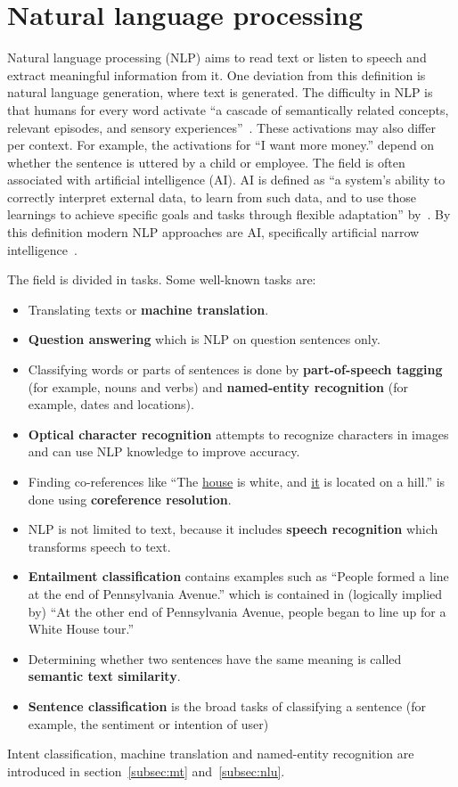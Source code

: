 \section{Natural language processing}
\label{sec:nlp}

Natural language processing (NLP) aims to read text or listen to speech and extract meaningful information from it.
One deviation from this definition is natural language generation, where text is generated.
The difficulty in NLP is that humans for every word activate ``a cascade of semantically related concepts, relevant episodes, and sensory experiences''~\citep{cambria2014jumping}.
These activations may also differ per context.
For example, the activations for ``I want more money.'' depend on whether the sentence is uttered by a child or employee.
The field is often associated with artificial intelligence (AI).
AI is defined as ``a system's ability to correctly interpret external data, to learn from such data, and to use those learnings to achieve specific goals and tasks through flexible adaptation'' by~\citep{kaplan2019siri}.
By this definition modern NLP approaches are AI, specifically artificial narrow intelligence~\citep{kaplan2019siri}.

The field is divided in tasks.
Some well-known tasks are:
\begin{itemize}
    \item Translating texts or \textbf{machine translation}.
    \item \textbf{Question answering} which is NLP on question sentences only.
    \item Classifying words or parts of sentences is done by \textbf{part-of-speech tagging} (for example, nouns and verbs) and \textbf{named-entity recognition} (for example, dates and locations).
    \item \textbf{Optical character recognition} attempts to recognize characters in images and can use NLP knowledge to improve accuracy.
    \item Finding co-references like ``The \underline{house} is white, and \underline{it} is located on a hill.'' is done using \textbf{coreference resolution}.
    \item NLP is not limited to text, because it includes \textbf{speech recognition} which transforms speech to text.
    \item \textbf{Entailment classification} contains examples such as ``People formed a line at the end of Pennsylvania Avenue.'' which is contained in (logically implied by) ``At the other end of Pennsylvania Avenue, people began to line up for a White House tour.''~\cite{williams2018}
    \item Determining whether two sentences have the same meaning is called \textbf{semantic text similarity}.
    \item \textbf{Sentence classification} is the broad tasks of classifying a sentence (for example, the sentiment or intention of user)
\end{itemize}
Intent classification, machine translation and named-entity recognition are introduced in section~\ref{subsec:mt} and~\ref{subsec:nlu}.

